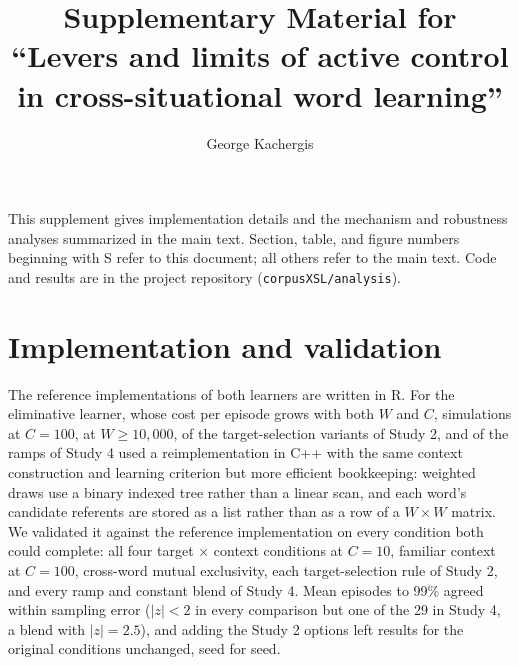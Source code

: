 \documentclass[11pt]{article}
\title{Supplementary Material for ``Levers and limits of active control in cross-situational word learning''}
\author{George Kachergis}
\date{}
\begin{document}
\maketitle
\sloppy

This supplement gives implementation details and the mechanism and robustness analyses summarized in the main text. Section, table, and figure numbers beginning with S refer to this document; all others refer to the main text. Code and results are in the project repository (\texttt{corpusXSL/analysis}).

\section{Implementation and validation}
\label{sec-impl}
The reference implementations of both learners are written in R. For the eliminative learner, whose cost per episode grows with both $W$ and $C$, simulations at $C=100$, at $W \ge 10{,}000$, of the target-selection variants of Study 2, and of the ramps of Study 4 used a reimplementation in C++ with the same context construction and learning criterion but more efficient bookkeeping: weighted draws use a binary indexed tree rather than a linear scan, and each word's candidate referents are stored as a list rather than as a row of a $W \times W$ matrix. We validated it against the reference implementation on every condition both could complete: all four target $\times$ context conditions at $C=10$, familiar context at $C=100$, cross-word mutual exclusivity, each target-selection rule of Study 2, and every ramp and constant blend of Study 4. Mean episodes to 99\% agreed within sampling error ($|z| < 2$ in every comparison but one of the 29 in Study 4, a blend with $|z| = 2.5$), and adding the Study 2 options left results for the original conditions unchanged, seed for seed.
\end{document}

